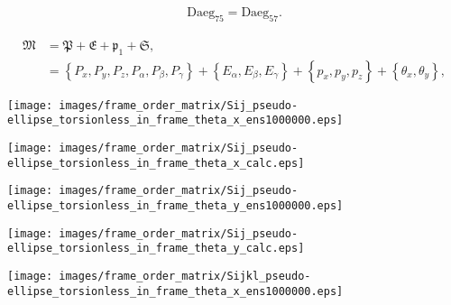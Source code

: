 \documentclass[a4paper,11pt,twoside,openright]{book}
\def\lthtmlcheckvsize{\ifdim\ht\sizebox<\vsize 
  \ifdim\wd\sizebox<\hsize\expandafter\hfill\fi \expandafter\vfill
  \else\expandafter\vss\fi}%
\begin{document}
{\newpage\clearpage
\setcounter{equation}{52}
%
\begin{subequations}\begin{flalign}
&\textrm{Daeg}_{75} = \textrm{Daeg}_{57} . &
\end{flalign}\end{subequations}%
\lthtmldisplayZ
\lthtmlcheckvsize\clearpage}

{\newpage\clearpage
\setcounter{equation}{53}
%
\begin{subequations}\begin{align}
\mathfrak{M}&= \mathfrak{P}+ \mathfrak{E}+ \mathfrak{p}_1+ \mathfrak{S}, \\
&= \left\{ P_x, P_y, P_z, P_\alpha , P_\beta , P_\gamma \right\}+ \left\{ E_\alpha , E_\beta , E_\gamma \right\}+ \left\{ p_x, p_y, p_z\right\}+ \left\{ \theta_x , \theta_y \right\} ,
\end{align}\end{subequations}%
\lthtmldisplayZ
\lthtmlcheckvsize\clearpage}

{\newpage\clearpage
{}%
\texttt{[image: images/frame\_order\_matrix/Sij\_pseudo-ellipse\_torsionless\_in\_frame\_theta\_x\_ens1000000.eps]}%
\lthtmlpictureZ
\lthtmlcheckvsize\clearpage}

{\newpage\clearpage
{}%
\texttt{[image: images/frame\_order\_matrix/Sij\_pseudo-ellipse\_torsionless\_in\_frame\_theta\_x\_calc.eps]}%
\lthtmlpictureZ
\lthtmlcheckvsize\clearpage}

{\newpage\clearpage
{}%
\texttt{[image: images/frame\_order\_matrix/Sij\_pseudo-ellipse\_torsionless\_in\_frame\_theta\_y\_ens1000000.eps]}%
\lthtmlpictureZ
\lthtmlcheckvsize\clearpage}

{\newpage\clearpage
{}%
\texttt{[image: images/frame\_order\_matrix/Sij\_pseudo-ellipse\_torsionless\_in\_frame\_theta\_y\_calc.eps]}%
\lthtmlpictureZ
\lthtmlcheckvsize\clearpage}

{\newpage\clearpage
{}%
\texttt{[image: images/frame\_order\_matrix/Sijkl\_pseudo-ellipse\_torsionless\_in\_frame\_theta\_x\_ens1000000.eps]}%
\lthtmlpictureZ
\lthtmlcheckvsize\clearpage}
\end{document}
